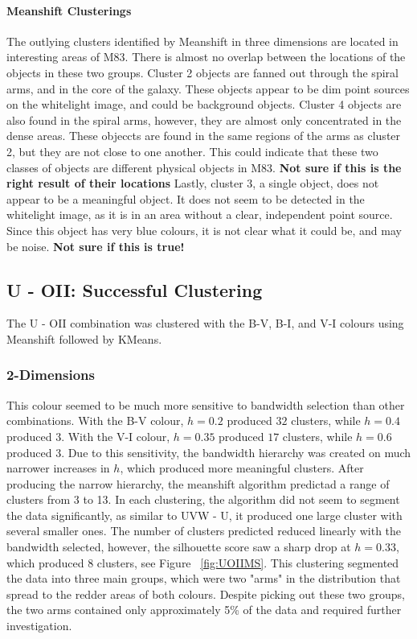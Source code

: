 \paragraph{Meanshift Clusterings}
The outlying clusters identified by Meanshift in three dimensions are located in interesting areas of M83.
There is almost no overlap between the locations of the objects in these two groups. 
Cluster 2 objects are fanned out through the spiral arms, and in the core of the galaxy.
These objects appear to be dim point sources on the whitelight image, and could be background objects. 
Cluster 4 objects are also found in the spiral arms, however, they are almost only concentrated in the dense areas. 
These objeccts are found in the same regions of the arms as cluster 2, but they are not close to one another. 
This could indicate that these two classes of objects are different physical objects in M83. \textbf{Not sure if this is the right result of their locations}
Lastly, cluster 3, a single object, does not appear to be a meaningful object. It does not seem to be detected in the whitelight image, as it is in an area without a clear, independent point source.
Since this object has very blue colours, it is not clear what it could be, and may be noise. \textbf{Not sure if this is true!}

\subsection{U - OII: Successful Clustering}
The U - OII combination was clustered with the B-V, B-I, and V-I colours using Meanshift followed by KMeans. %

\subsubsection{2-Dimensions}

This colour seemed to be much more sensitive to bandwidth selection than other combinations.
With the B-V colour, $h=0.2$ produced $32$ clusters, while $h=0.4$ produced $3$. With the V-I colour, $h=0.35$ produced $17$ clusters, while $h=0.6$ produced $3$.
Due to this sensitivity, the bandwidth hierarchy was created on much narrower increases in $h$, which produced more meaningful clusters.
After producing the narrow hierarchy, the meanshift algorithm predictad a range of clusters from 3 to 13.
In each clustering, the algorithm did not seem to segment the data significantly, as similar to UVW - U, it produced one large cluster with several smaller ones.
The number of clusters predicted reduced linearly with the bandwidth selected, however, the silhouette score saw a sharp drop at $h = 0.33$, which produced 8 clusters, see Figure ~\ref{fig:UOIIMS}. 
This clustering segmented the data into three main groups, which were two "arms" in the distribution that spread to the redder areas of both colours.
Despite picking out these two groups, the two arms contained only approximately 5\% of the data and required further investigation. 

